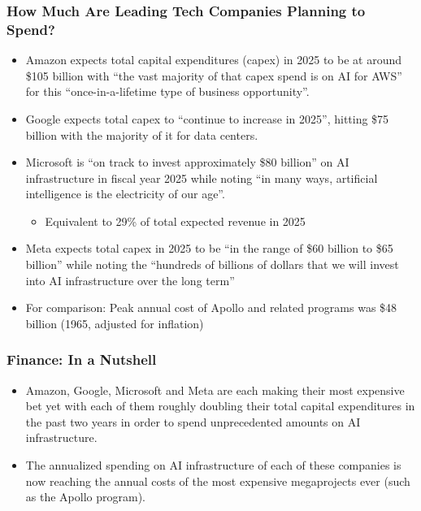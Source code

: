 \documentclass[aspectratio=169]{beamer}
\begin{document}
    \begin{frame}
        \frametitle{How Much Are Leading Tech Companies Planning to Spend?}
        \begin{itemize}
            \item Amazon expects total capital expenditures (capex) in 2025 to be at around \$105 billion with ``the vast majority of that capex spend is on AI for AWS'' for this ``once-in-a-lifetime type of business opportunity''.~\parencite{cnbc_amazon_2025}
            \item Google expects total capex to ``continue to increase in 2025'', hitting \$75 billion with the majority of it for data centers.~\parencite{data_center_dynamics_google_2025}
            \item Microsoft is ``on track to invest approximately \$80 billion'' on AI infrastructure in fiscal year 2025 while noting ``in many ways, artificial intelligence is the electricity of our age''.~\parencite{microsoft_golden_2025}
            \begin{itemize}
                \item Equivalent to 29\% of total expected revenue in 2025~\parencite{yahoo_finance_microsoft_2025}
            \end{itemize}
            \item Meta expects total capex in 2025 to be ``in the range of \$60 billion to \$65 billion'' while noting the ``hundreds of billions of dollars that we will invest into AI infrastructure over the long term''~\parencite{meta_earnings_call_2025}
            \item For comparison: Peak annual cost of Apollo and related programs was \$48 billion (1965, adjusted for inflation)~\parencite{planetary_society_how_2019}
        \end{itemize}
    \end{frame}
    \begin{frame}
        \frametitle{Finance: In a Nutshell}
        \begin{itemize}
            \item Amazon, Google, Microsoft and Meta are each making their most expensive bet yet with each of them roughly doubling their total capital expenditures in the past two years in order to spend unprecedented amounts on AI infrastructure.
            \item The annualized spending on AI infrastructure of each of these companies is now reaching the annual costs of the most expensive megaprojects ever (such as the Apollo program).
        \end{itemize}
    \end{frame}
\end{document}
